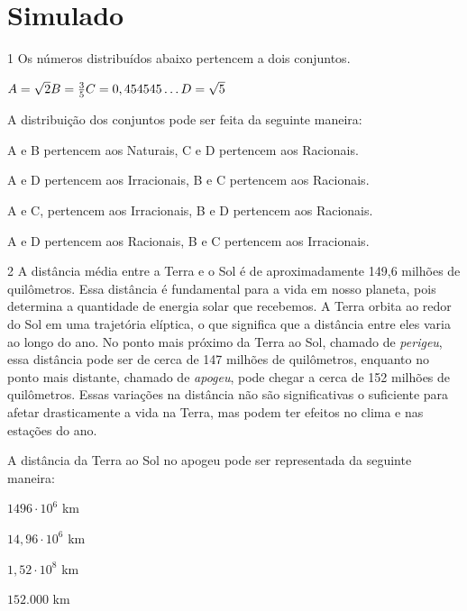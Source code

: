 \setcounter{chapter}{0}
\chapter[Simulado 1]{Simulado}

\num{1} Os números distribuídos abaixo pertencem a dois conjuntos.

\bigskip

\noindent$A = \sqrt{2} \\ 
B = \frac{3}{5} \\ 
C = 0,454545\ldots{} \\
D = \sqrt{5}$

\bigskip

A distribuição dos conjuntos pode ser feita da seguinte maneira:

\begin{escolha}

  \item A e B pertencem aos Naturais, C e D pertencem aos Racionais.

  \item A e D pertencem aos Irracionais, B e C pertencem aos Racionais.
  
  \item A e C, pertencem aos Irracionais, B e D pertencem aos Racionais.
  
  \item A e D pertencem aos Racionais, B e C pertencem aos Irracionais.

\end{escolha}



\num{2} A distância média entre a Terra e o Sol é de aproximadamente 149,6
milhões de quilômetros. Essa distância é fundamental para a vida em
nosso planeta, pois determina a quantidade de energia solar que
recebemos. A Terra orbita ao redor do Sol em uma trajetória elíptica,
o que significa que a distância entre eles varia ao longo do ano. No
ponto mais próximo da Terra ao Sol, chamado de \textit{perigeu}, essa distância
pode ser de cerca de 147 milhões de quilômetros, enquanto no ponto
mais distante, chamado de \textit{apogeu}, pode chegar a cerca de 152 milhões
de quilômetros. Essas variações na distância não são significativas o
suficiente para afetar drasticamente a vida na Terra, mas podem ter
efeitos no clima e nas estações do ano.

A distância da Terra ao Sol no apogeu pode ser representada da seguinte maneira:

\begin{escolha}

  \item $1496 \cdot 10^{6}$ km 

  \item $14,96 \cdot 10^{6}$ km 

  \item $1,52 \cdot 10^{8}$ km 

  \item $152.000$ km

\end{escolha}

